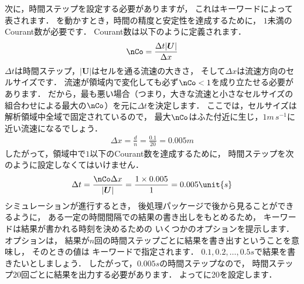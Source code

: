 次に，時間ステップを設定する必要がありますが，
これはキーワードによって表されます．
を動かすとき，時間の精度と安定性を達成するために，
$1$未満のCourant数が必要です．
%
Courant数は以下のように定義されます．
\begin{align}
 \label{eq:2.2}
  \nCo = \frac{\Delta t|\bm{U}|}{\Delta x}
\end{align}
$\Delta t$は時間ステップ，$|\bm{U}|$はセルを通る流速の大きさ，
そして$\Delta x$は流速方向のセルサイズです．
流速が領域内で変化しても必ず$\nCo < 1$を成り立たせる必要があります．
だから，最も悪い場合（つまり，大きな流速と小さなセルサイズの
組合わせによる最大の$\nCo$）を元に$\Delta t$を決定します．
ここでは，セルサイズは解析領域中全域で固定されているので，
最大$\nCo$はふた付近に生じ，$1\unit{m\,s^{-1}}$に近い流速になるでしょう．
\begin{align}
 \label{eq:2.3}
  \Delta x = \frac{d}{n} = \frac{0.1}{20} = 0.005\unit{m}
\end{align}
したがって，領域中で$1$以下のCourant数を達成するために，
%
時間ステップを次のように設定しなくてはいけません．
\begin{align}
 \label{eq:2.4}
  \Delta t = \frac{\nCo\Delta x}{|\bm{U}|}
  = \frac{1 \times 0.005}{1} = 0.005\unit{s}
\end{align}
シミュレーションが進行するとき，
後処理パッケージで後から見ることができるように，
ある一定の時間間隔での結果の書き出しをもとめるため，
%
%
キーワードは結果が書かれる時刻を決めるための
いくつかのオプションを提示します．
%
%
オプションは，
結果が$n$回の時間ステップごとに結果を書き出すということを意味し，
そのときの値は
%
%
キーワードで指定されます．
$0.1, 0.2, \ldots, 0.5\unit{s}$で結果を書きたいとしましょう．
したがって，$0.005\unit{s}$の時間ステップなので，
時間ステップ$20$回ごとに結果を出力する必要があります．
よってに20を設定します．

